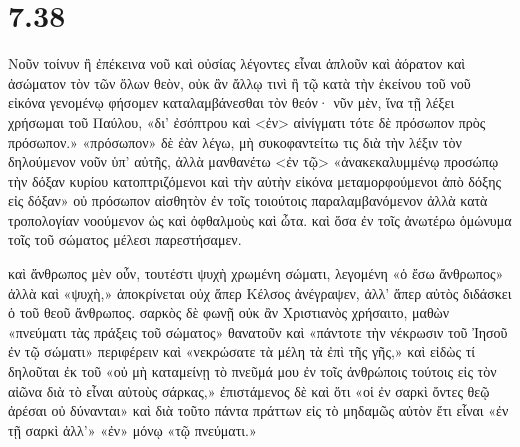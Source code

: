 \section*{7.38}

Νοῦν τοίνυν ἢ ἐπέκεινα νοῦ καὶ οὐσίας λέγοντες εἶναι ἁπλοῦν καὶ ἀόρατον καὶ ἀσώματον τὸν τῶν ὅλων θεὸν, οὐκ ἂν ἄλλῳ τινὶ ἢ τῷ κατὰ τὴν ἐκείνου τοῦ νοῦ εἰκόνα γενομένῳ φήσομεν καταλαμβάνεσθαι τὸν θεόν· νῦν μὲν, ἵνα τῇ λέξει χρήσωμαι τοῦ Παύλου, «δι' ἐσόπτρου καὶ <ἐν> αἰνίγματι τότε δὲ πρόσωπον πρὸς πρόσωπον.» «πρόσωπον» δὲ ἐὰν λέγω, μὴ συκοφαντείτω τις διὰ τὴν λέξιν τὸν δηλούμενον νοῦν ὑπ' αὐτῆς, ἀλλὰ μανθανέτω <ἐν τῷ> «ἀνακεκαλυμμένῳ προσώπῳ τὴν δόξαν κυρίου κατοπτριζόμενοι καὶ τὴν αὐτὴν εἰκόνα μεταμορφούμενοι ἀπὸ δόξης εἰς δόξαν» οὐ πρόσωπον αἰσθητὸν ἐν τοῖς τοιούτοις παραλαμβανόμενον ἀλλὰ κατὰ τροπολογίαν νοούμενον ὡς καὶ ὀφθαλμοὺς καὶ ὦτα. καὶ ὅσα ἐν τοῖς ἀνωτέρω ὁμώνυμα τοῖς τοῦ σώματος μέλεσι παρεστήσαμεν.

καὶ ἄνθρωπος μὲν οὖν, τουτέστι ψυχὴ χρωμένη σώματι, λεγομένη «ὁ ἔσω ἄνθρωπος» ἀλλὰ καὶ «ψυχὴ,» ἀποκρίνεται οὐχ ἅπερ Κέλσος ἀνέγραψεν, ἀλλ' ἅπερ αὐτὸς διδάσκει ὁ τοῦ θεοῦ ἄνθρωπος. σαρκὸς δὲ φωνῇ οὐκ ἂν Χριστιανὸς χρήσαιτο, μαθὼν «πνεύματι τὰς πράξεις τοῦ σώματος» θανατοῦν καὶ «πάντοτε τὴν νέκρωσιν τοῦ Ἰησοῦ ἐν τῷ σώματι» περιφέρειν καὶ «νεκρώσατε τὰ μέλη τὰ ἐπὶ τῆς γῆς,» καὶ εἰδὼς τί δηλοῦται ἐκ τοῦ «οὐ μὴ καταμείνῃ τὸ πνεῦμά μου ἐν τοῖς ἀνθρώποις τούτοις εἰς τὸν αἰῶνα διὰ τὸ εἶναι αὐτοὺς σάρκας,» ἐπιστάμενος δὲ καὶ ὅτι «οἱ ἐν σαρκὶ ὄντες θεῷ ἀρέσαι οὐ δύνανται» καὶ διὰ τοῦτο πάντα πράττων εἰς τὸ μηδαμῶς αὐτὸν ἔτι εἶναι «ἐν τῇ σαρκὶ ἀλλ'» «ἐν» μόνῳ «τῷ πνεύματι.»